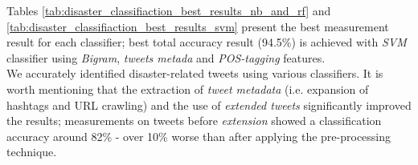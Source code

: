 \documentclass[letterpaper,twocolumn,10pt]{article}
\begin{document}
Tables  \ref{tab:disaster_classifiaction_best_results_nb_and_rf} and \ref{tab:disaster_classifiaction_best_results_svm} present the best measurement result for each classifier; best total accuracy result (94.5\%) is achieved with \textit{SVM} classifier using \textit{Bigram}, \textit{tweets metada} and \textit{POS-tagging} features.\\

We accurately identified disaster-related tweets using various classifiers. It is worth mentioning that the extraction of \textit{tweet metadata} (i.e. expansion of hashtags and URL crawling) and the use of \textit{extended tweets} significantly improved the results; measurements on tweets before \textit{extension} showed a classification accuracy around 82\% - over 10\% worse than after applying the pre-processing technique.

\begin{table}[H]
	\begin{center}
	\end{center}
	\caption{Disaster Classification Best Results: \textit{Naive Bayes} and \textit{Random Forest}}
\label{tab:disaster_classifiaction_best_results_nb_and_rf}
\end{table}

\begin{table}[H]
	\begin{center}
	\end{center}
	\caption{Disaster Classification Best Results: \textit{SVM}}
\label{tab:disaster_classifiaction_best_results_svm}
\end{table}
\end{document}
